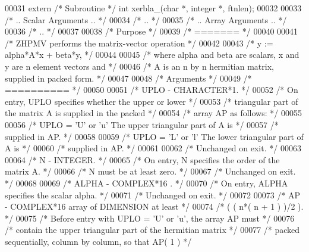 \begin{DoxyCode}
00031     \textcolor{keyword}{extern} \textcolor{comment}{/* Subroutine */} \textcolor{keywordtype}{int} xerbla\_(\textcolor{keywordtype}{char} *, integer *, ftnlen);
00032 
00033 \textcolor{comment}{/*     .. Scalar Arguments .. */}
00034 \textcolor{comment}{/*     .. */}
00035 \textcolor{comment}{/*     .. Array Arguments .. */}
00036 \textcolor{comment}{/*     .. */}
00037 
00038 \textcolor{comment}{/*  Purpose */}
00039 \textcolor{comment}{/*  ======= */}
00040 
00041 \textcolor{comment}{/*  ZHPMV  performs the matrix-vector operation */}
00042 
00043 \textcolor{comment}{/*     y := alpha*A*x + beta*y, */}
00044 
00045 \textcolor{comment}{/*  where alpha and beta are scalars, x and y are n element vectors and */}
00046 \textcolor{comment}{/*  A is an n by n hermitian matrix, supplied in packed form. */}
00047 
00048 \textcolor{comment}{/*  Arguments */}
00049 \textcolor{comment}{/*  ========== */}
00050 
00051 \textcolor{comment}{/*  UPLO   - CHARACTER*1. */}
00052 \textcolor{comment}{/*           On entry, UPLO specifies whether the upper or lower */}
00053 \textcolor{comment}{/*           triangular part of the matrix A is supplied in the packed */}
00054 \textcolor{comment}{/*           array AP as follows: */}
00055 
00056 \textcolor{comment}{/*              UPLO = 'U' or 'u'   The upper triangular part of A is */}
00057 \textcolor{comment}{/*                                  supplied in AP. */}
00058 
00059 \textcolor{comment}{/*              UPLO = 'L' or 'l'   The lower triangular part of A is */}
00060 \textcolor{comment}{/*                                  supplied in AP. */}
00061 
00062 \textcolor{comment}{/*           Unchanged on exit. */}
00063 
00064 \textcolor{comment}{/*  N      - INTEGER. */}
00065 \textcolor{comment}{/*           On entry, N specifies the order of the matrix A. */}
00066 \textcolor{comment}{/*           N must be at least zero. */}
00067 \textcolor{comment}{/*           Unchanged on exit. */}
00068 
00069 \textcolor{comment}{/*  ALPHA  - COMPLEX*16      . */}
00070 \textcolor{comment}{/*           On entry, ALPHA specifies the scalar alpha. */}
00071 \textcolor{comment}{/*           Unchanged on exit. */}
00072 
00073 \textcolor{comment}{/*  AP     - COMPLEX*16       array of DIMENSION at least */}
00074 \textcolor{comment}{/*           ( ( n*( n + 1 ) )/2 ). */}
00075 \textcolor{comment}{/*           Before entry with UPLO = 'U' or 'u', the array AP must */}
00076 \textcolor{comment}{/*           contain the upper triangular part of the hermitian matrix */}
00077 \textcolor{comment}{/*           packed sequentially, column by column, so that AP( 1 ) */}

\end{DoxyCode}
